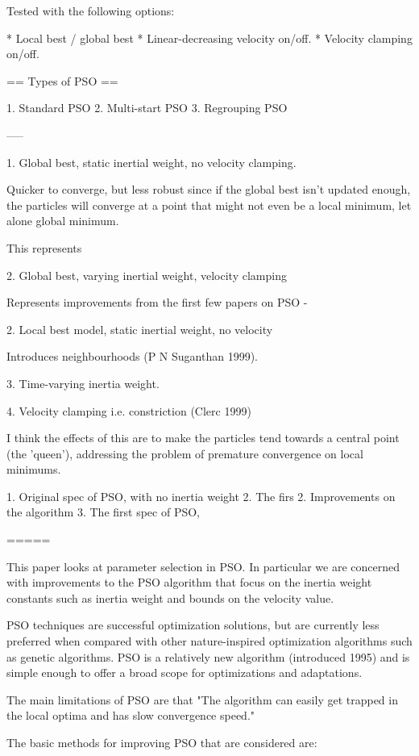 Tested with the following options:

* Local best / global best
* Linear-decreasing velocity on/off.
* Velocity clamping on/off.

== Types of PSO ==

1. Standard PSO
2. Multi-start PSO
3. Regrouping PSO


-----

1. Global best, static inertial weight, no velocity clamping.

Quicker to converge, but less robust since if the global best isn't updated
enough, the particles will converge at a point that might not even be a local
minimum, let alone global minimum.

This represents

2. Global best, varying inertial weight, velocity clamping

Represents improvements from the first few papers on PSO - 

2. Local best model, static inertial weight, no velocity 

Introduces neighbourhoods (P N Suganthan 1999).

3. Time-varying inertia weight.


4. Velocity clamping i.e. constriction (Clerc 1999)

I think the effects of this are to make the particles tend towards a central
point (the 'queen'), addressing the problem of premature convergence on local
minimums.

1. Original spec of PSO, with no inertia weight
2. The firs
2. Improvements on the algorithm
3. The first spec of PSO, 

=====


This paper looks at parameter selection in PSO.  In particular we are concerned
with improvements to the PSO algorithm that focus on the inertia weight constants such as inertia
weight and bounds on the velocity value.

PSO techniques are successful optimization solutions, but are currently less
preferred when compared with other nature-inspired optimization algorithms such
as genetic algorithms.  PSO is a relatively new algorithm (introduced 1995) and
is simple enough to offer a broad scope for optimizations and adaptations.

The main limitations of PSO are that "The algorithm can easily get trapped in
the local optima and has slow convergence speed."

The basic methods for improving PSO that are considered are:

